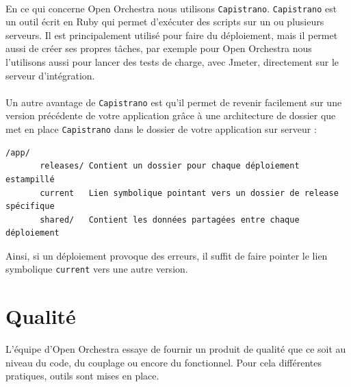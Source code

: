 \paragraph{}
En ce qui concerne Open Orchestra nous utilisons \verb?Capistrano?. \verb?Capistrano? est un outil écrit en Ruby qui permet d'exécuter des scripts sur un ou plusieurs serveurs. Il est principalement utilisé pour faire du déploiement, mais il permet aussi de créer ses propres tâches, par exemple pour Open Orchestra nous l'utilisons aussi pour lancer des tests de charge, avec Jmeter, directement sur le serveur d'intégration.
\paragraph{}
Un autre avantage de \verb?Capistrano? est qu'il permet de revenir facilement sur une version précédente de votre application grâce à une architecture de dossier que met en place \verb?Capistrano? dans le dossier de votre application sur serveur : 
\begin{verbatim}
/app/
       releases/ Contient un dossier pour chaque déploiement estampillé
       current   Lien symbolique pointant vers un dossier de release spécifique
       shared/   Contient les données partagées entre chaque déploiement
\end{verbatim}
Ainsi, si un déploiement provoque des erreurs, il suffit de faire pointer le lien symbolique \verb?current? vers une autre version.

\section{Qualité}
L'équipe d'Open Orchestra essaye de fournir un produit de qualité que ce soit au niveau du code, du couplage ou encore du fonctionnel. Pour cela différentes pratiques, outils sont mises en place.

